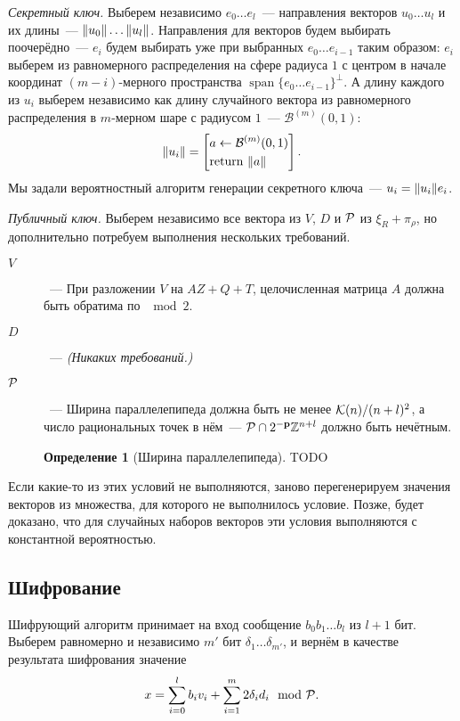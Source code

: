 \documentclass[oneside, a4paper]{article}
\theoremstyle{plain}
\theoremstyle{definition}
\newtheorem{defn}{Определение}
\theoremstyle{remark}
\newenvironment{definition}[1]{%
\begin{tcolorbox}[breakable,enhanced]
\begin{defn}[#1]
}{%
\end{defn}
\end{tcolorbox}
}
\DeclareMathOperator{\Span}{span}
\newcommand\p{\ensuremath \mathbf p}
\newcommand\PP{\ensuremath \mathcal P}
\newcommand\KK{\ensuremath \mathcal K}
\newcommand\Z{\ensuremath \mathbb Z}
\DeclarePairedDelimiter\norm{\lVert}{\rVert}
\begin{document}
\emph{Секретный ключ.} Выберем независимо $e_0 \dots e_l$~--- направления
векторов $u_0 \dots u_l$ и их длины~--- $\norm{u_0} \dots \norm{u_l}$.
Направления для векторов будем выбирать поочерёдно~--- $e_i$ будем выбирать уже
при выбранных $e_0 \dots e_{i-1}$ таким образом: $e_i$ выберем из равномерного
распределения на сфере радиуса $1$ с центром в начале координат
$(m-i)$-мерного пространства $\Span \{e_0 \dots e_{i-1}\}^\bot$. А длину
каждого из $u_i$ выберем независимо как длину случайного вектора из равномерного
распределения в $m$-мерном шаре с радиусом $1$~--- $\mathcal B^{(m)}(0,1)$:
\[
\norm{u_i} =
\left [
\begin{aligned}
&a \gets \mathcal B^{(m)}(0,1) \\
&\text{return } \norm{a}
\end{aligned}
\right ].
\]
Мы задали вероятностный алгоритм генерации секретного ключа~--- $u_i = \norm{u_i}
e_i$.

\emph{Публичный ключ.} Выберем независимо все вектора из $V$, $D$ и $\PP$ из
$\xi_R + \pi_\rho$, но дополнительно потребуем выполнения нескольких требований.
\begin{description}
\item[$V$]~--- При разложении $V$ на $AZ + Q + T$, целочисленная матрица $A$
должна быть обратима по $\mod 2$.
\item[$D$]~--- \emph{(Никаких требований.)}
\item[$\PP$]~--- Ширина параллелепипеда должна быть не менее $\KK(n)/(n+l)^2$, а
число рациональных точек в нём~--- $\PP \cap 2^{-\p}\Z^{n+l}$ должно быть нечётным.
\begin{definition}{Ширина параллелепипеда}
TODO
\end{definition}
\end{description}
Если какие-то из этих условий не выполняются, заново перегенерируем значения
векторов из множества, для которого не выполнилось условие. Позже, будет
доказано, что для случайных наборов векторов эти условия выполняются с
константной вероятностью.

\subsection{Шифрование} Шифрующий алгоритм принимает на вход сообщение $b_0 b_1 \dots
b_l$ из $l+1$ бит. Выберем равномерно и независимо $m'$ бит $\delta_1 \dots
\delta_{m'}$, и вернём в качестве результата шифрования значение
\[
x = \sum_{i = 0}^l b_i v_i + \sum_{i = 1}^m 2 \delta_i d_i \mod \PP.
\]
\end{document}
